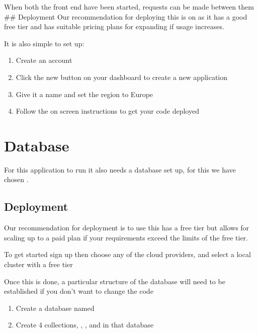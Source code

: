 \documentclass[letterpaper,10pt,english]{sphinxmanual}
\begin{document}
When both the front end have been started, requests can be made between
them \#\# Deployment Our recommendation for deploying this is on
 as it has a good free tier and has
suitable pricing plans for expanding if usage increases.

It is also simple to set up:
\begin{enumerate}
%
\item {} 
Create an account 

\item {} 
Click the new button on your dashboard to create a new application

\item {} 
Give it a name and set the region to Europe

\item {} 
Follow the on screen instructions to get your code deployed

\end{enumerate}


\section{Database}
\label{\detokenize{docs/Installation/database:database}}\label{\detokenize{docs/Installation/database::doc}}
For this application to run it also needs a database set up, for this we
have chosen .


\subsection{Deployment}
\label{\detokenize{docs/Installation/database:deployment}}
Our recommendation for deployment is to use  this has a free tier but
allows for scaling up to a paid plan if your requirements exceed the
limits of the free tier.

To get started sign up 
then choose any of the cloud providers, and select a local cluster with
a free tier

Once this is done, a particular structure of the database will need to
be established if you don’t want to change the code
\begin{enumerate}
%
\item {} 
Create a database named 

\item {} 
Create 4 collections, , ,  and  in
that database

\end{enumerate}
\end{document}
